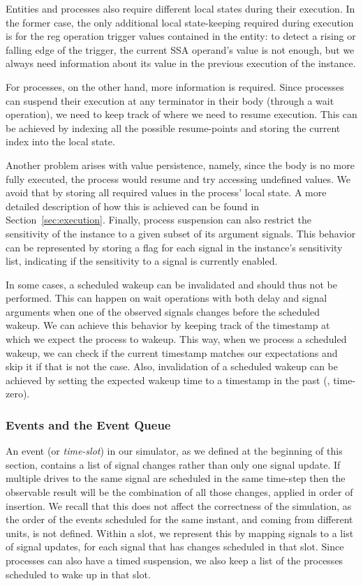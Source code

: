 Entities and processes also require different local states during their execution. In the former case, the only additional local state-keeping required during execution is for the reg operation trigger values contained in the entity: to detect a rising or falling edge of the trigger, the current SSA operand's value is not enough, but we always need information about its value in the previous execution of the instance.

For processes, on the other hand, more information is required. Since processes can suspend their execution at any terminator in their body (through a wait operation), we need to keep track of where we need to resume execution. This can be achieved by indexing all the possible resume-points and storing the current index into the local state.

Another problem arises with value persistence, namely, since the body is no more fully executed, the process would resume and try accessing undefined values. We avoid that by storing all required values in the process' local state. A more detailed description of how this is achieved can be found in Section~\ref{sec:execution}. Finally, process suspension can also restrict the sensitivity of the instance to a given subset of its argument signals. This behavior can be represented by storing a flag for each signal in the instance's sensitivity list, indicating if the sensitivity to a signal is currently enabled.

In some cases, a scheduled wakeup can be invalidated and should thus not be performed. This can happen on wait operations with both delay and signal arguments when one of the observed signals changes before the scheduled wakeup. We can achieve this behavior by keeping track of the timestamp at which we expect the process to wakeup. This way, when we process a scheduled wakeup, we can check if the current timestamp matches our expectations and skip it if that is not the case. Also, invalidation of a scheduled wakeup can be achieved by setting the expected wakeup time to a timestamp in the past (\eg, time-zero).


\subsubsection{Events and the Event Queue}
An event (or \textit{time-slot}) in our simulator, as we defined at the beginning of this section, contains a list of signal changes rather than only one signal update. If multiple drives to the same signal are scheduled in the same time-step then the observable result will be the combination of all those changes, applied in order of insertion. We recall that this does not affect the correctness of the simulation, as the order of the events scheduled for the same instant, and coming from different units, is not defined. Within a slot, we represent this by mapping signals to a list of signal updates, for each signal that has changes scheduled in that slot. Since processes can also have a timed suspension, we also keep a list of the processes scheduled to wake up in that slot.

